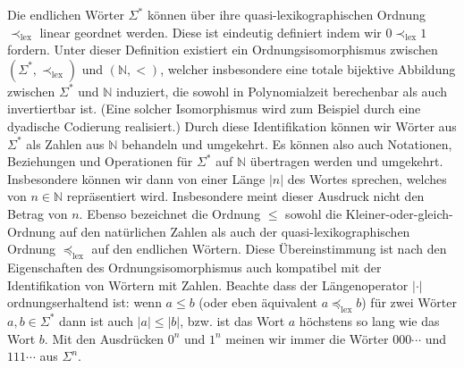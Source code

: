 Die endlichen Wörter $\Sigma^*$ können über ihre quasi-lexikographischen Ordnung $\prec_\mathrm{lex}$ linear geordnet werden. Diese ist eindeutig definiert indem wir $0\prec_\mathrm{lex} 1$ fordern. Unter dieser Definition existiert ein Ordnungsisomorphismus zwischen $(\Sigma^*,\prec_\mathrm{lex})$ und $(\mathbb N, <)$, welcher insbesondere eine totale bijektive Abbildung zwischen $\Sigma^*$ und $\mathbb N$ induziert, die sowohl in Polynomialzeit berechenbar als auch invertiertbar ist. (Eine solcher Isomorphismus wird zum Beispiel durch eine dyadische Codierung realisiert.) Durch diese Identifikation können wir Wörter aus $\Sigma^*$ als Zahlen aus $\mathbb N$ behandeln und umgekehrt. Es können also auch Notationen, Beziehungen und Operationen für $\Sigma^*$ auf $\mathbb N$ übertragen werden und umgekehrt. Insbesondere können wir dann von einer Länge $|n|$ des Wortes sprechen, welches von $n\in\mathbb N$ repräsentiert wird. Insbesondere meint dieser Ausdruck nicht den Betrag von $n$. Ebenso bezeichnet die Ordnung $\leq$ sowohl die Kleiner-oder-gleich-Ordnung auf den natürlichen Zahlen als auch der quasi-lexikographischen Ordnung $\preceq_\mathrm{lex}$ auf den endlichen Wörtern. Diese Übereinstimmung ist nach den Eigenschaften des Ordnungsisomorphismus auch kompatibel mit der Identifikation von Wörtern mit Zahlen. 
Beachte dass der Längenoperator $|\cdot|$ ordnungserhaltend ist: wenn $a\leq b$ (oder eben äquivalent $a\preceq_\mathrm{lex}b$) für zwei Wörter $a,b\in\Sigma^*$ dann ist auch $|a|\leq |b|$, bzw. ist das Wort $a$ höchstens so lang wie das Wort $b$.
Mit den Ausdrücken $0^n$ und $1^n$ meinen wir immer die Wörter $000\cdots$ und $111\cdots$ aus $\Sigma^n$.

